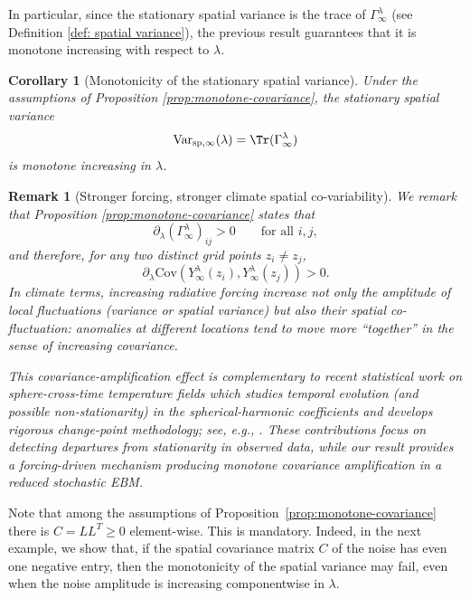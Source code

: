 \documentclass[10pt]{amsart}
\newtheorem{corollary}[theorem]{Corollary}
\newtheorem{remark}[theorem]{Remark}
\numberwithin{equation}{section}
\begin{document}
In particular, since the stationary spatial variance is the trace of $\Gamma ^\lambda_\infty $ (see Definition \ref{def: spatial variance}), the previous result guarantees that it is monotone increasing with respect to $\lambda$.
\begin{corollary}[Monotonicity of the stationary spatial variance]
Under the assumptions of Proposition \ref{prop:monotone-covariance}, the stationary spatial variance
\[
\mathrm{Var}_{\mathrm{sp},\infty}(\lambda)=\Tr(\Gamma_\infty^\lambda)
\]
is monotone increasing in $\lambda$.
\end{corollary}
\begin{remark}[Stronger forcing, stronger climate spatial co-variability]
We remark that Proposition \ref{prop:monotone-covariance} states that
$$
\partial_\lambda (\Gamma_\infty^\lambda)_{ij}>0\qquad \text{for all } i,j,
$$
and therefore, for any two distinct grid points $z_i\neq z_j$,
$$
\partial_\lambda  \mathrm{Cov} \left(Y_\infty^\lambda(z_i),Y_\infty^\lambda(z_j)\right)>0.
$$
In climate terms, increasing radiative forcing increase not only the amplitude of local fluctuations (variance or spatial variance) but also their \emph{spatial co-fluctuation}: anomalies at different locations tend to move more ``together'' in the sense of increasing covariance.

This covariance-amplification effect is complementary to recent statistical work on sphere-cross-time temperature fields which studies temporal evolution (and possible non-stationarity) in the spherical-harmonic coefficients and develops rigorous change-point methodology; see, e.g., \cite{Caponera2021,Caponera2023, Marinucci2021,Marinucci2024}. These contributions focus on detecting departures from stationarity in observed data, while our result provides a forcing-driven mechanism producing monotone covariance amplification in a reduced stochastic EBM.
\end{remark}
Note that among the assumptions of Proposition~\ref{prop:monotone-covariance} there is $C = L L^T \geq0$ element-wise. This is mandatory. Indeed, in the next example, we show that, if the spatial covariance matrix $C$ of the noise has even one negative entry, then the monotonicity of the spatial variance
may fail, even when the noise amplitude is increasing componentwise in $\lambda$.
\end{document}
